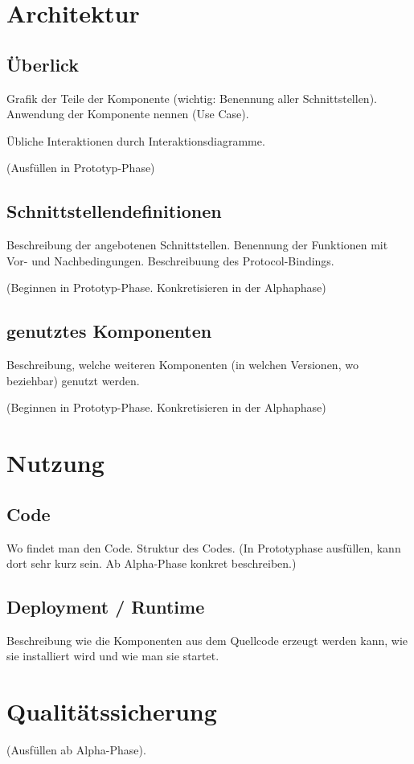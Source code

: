 \section{Architektur}

\subsection{Überlick}
Grafik der Teile der Komponente (wichtig: Benennung aller Schnittstellen). 
Anwendung der Komponente nennen (Use Case).

Übliche Interaktionen durch Interaktionsdiagramme.

(Ausfüllen in Prototyp-Phase)

\subsection{Schnittstellendefinitionen}
Beschreibung der angebotenen Schnittstellen. Benennung der Funktionen
mit Vor- und Nachbedingungen. Beschreibuung des Protocol-Bindings.

(Beginnen in Prototyp-Phase. Konkretisieren in der Alphaphase)

\subsection{genutztes Komponenten}
Beschreibung, welche weiteren Komponenten (in welchen Versionen, wo beziehbar) genutzt werden.

(Beginnen in Prototyp-Phase. Konkretisieren in der Alphaphase)

\section{Nutzung}
\subsection{Code}
Wo findet man den Code. Struktur des Codes. (In Prototyphase ausfüllen,
kann dort sehr kurz sein. Ab Alpha-Phase konkret beschreiben.)

\subsection{Deployment / Runtime}
Beschreibung wie die Komponenten aus dem Quellcode erzeugt werden kann,
wie sie installiert wird und wie man sie startet.

\section{Qualitätssicherung}
(Ausfüllen ab Alpha-Phase).

